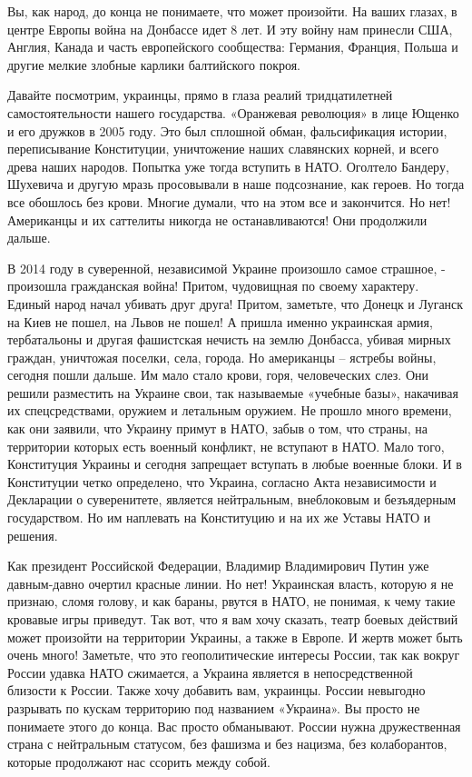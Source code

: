 Вы, как народ, до конца не понимаете, что может произойти. На ваших глазах, в
центре Европы война на Донбассе идет 8 лет. И эту войну нам принесли США,
Англия, Канада и часть европейского сообщества: Германия, Франция, Польша и
другие мелкие злобные карлики балтийского покроя.

Давайте посмотрим, украинцы, прямо в глаза реалий тридцатилетней
самостоятельности нашего государства. «Оранжевая революция» в лице Ющенко и его
дружков в 2005 году. Это был сплошной обман, фальсификация истории,
переписывание Конституции, уничтожение наших славянских корней, и всего древа
наших народов. Попытка уже тогда вступить в НАТО. Оголтело Бандеру, Шухевича и
другую мразь просовывали в наше подсознание, как героев. Но тогда все обошлось
без крови. Многие думали, что на этом все и закончится. Но нет! Американцы и их
саттелиты никогда не останавливаются! Они продолжили дальше.

В 2014 году в суверенной, независимой Украине произошло самое страшное, -
произошла гражданская война! Притом, чудовищная по своему характеру. Единый
народ начал убивать друг друга! Притом, заметьте, что Донецк и Луганск на Киев
не пошел, на Львов не пошел! А пришла именно украинская армия, тербатальоны и
другая фашистская нечисть на землю Донбасса, убивая мирных граждан, уничтожая
поселки, села, города. Но американцы – ястребы войны, сегодня пошли дальше. Им
мало стало крови, горя, человеческих слез. Они решили разместить на Украине
свои, так называемые «учебные базы», накачивая их спецсредствами, оружием и
летальным оружием. Не прошло много времени, как они заявили, что Украину примут
в НАТО, забыв о том, что страны, на территории которых есть военный конфликт,
не вступают в НАТО. Мало того, Конституция Украины и сегодня запрещает вступать
в любые военные блоки. И в Конституции четко определено, что Украина, согласно
Акта независимости и Декларации о суверенитете, является нейтральным,
внеблоковым и безъядерным государством. Но им наплевать на Конституцию и на их
же Уставы НАТО и решения.

Как президент Российской Федерации, Владимир Владимирович Путин уже
давным-давно очертил красные линии. Но нет! Украинская власть, которую я не
признаю, сломя голову, и как бараны, рвутся в НАТО, не понимая, к чему такие
кровавые игры приведут. Так вот, что я вам хочу сказать, театр боевых действий
может произойти на территории Украины, а также в Европе. И жертв может быть
очень много! Заметьте, что это геополитические  интересы России, так как вокруг
России удавка НАТО сжимается, а Украина является в непосредственной близости к
России. Также хочу добавить вам, украинцы. России невыгодно разрывать по кускам
территорию под названием «Украина». Вы просто не понимаете этого до конца. Вас
просто обманывают. России нужна дружественная страна с нейтральным статусом,
без фашизма и без нацизма, без колаборантов, которые продолжают нас ссорить
между собой.

